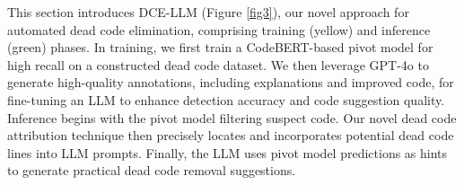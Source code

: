 \documentclass[11pt]{article}
\begin{document}

This section introduces DCE-LLM (Figure \ref{fig3}), our novel approach for automated dead code elimination, comprising training (yellow) and inference (green) phases.  In training, we first train a CodeBERT-based pivot model for high recall on a constructed dead code dataset.  We then leverage GPT-4o to generate high-quality annotations, including explanations and improved code, for fine-tuning an LLM to enhance detection accuracy and code suggestion quality.  Inference begins with the pivot model filtering suspect code.  Our novel dead code attribution technique then precisely locates and incorporates potential dead code lines into LLM prompts. Finally, the LLM uses pivot model predictions as hints to generate practical dead code removal suggestions.
\end{document}
